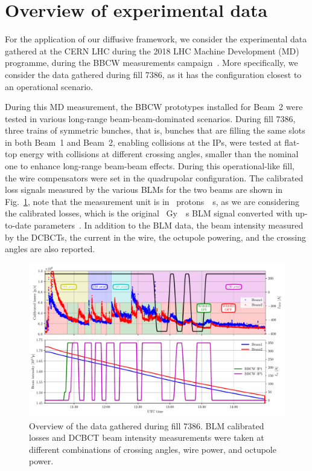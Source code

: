 \section{Overview of experimental data}\label{sec:5:wire-data}

For the application of our diffusive framework, we consider the experimental data gathered at the CERN LHC during the 2018 LHC Machine Development (MD) programme, during the BBCW measurements campaign~\cite{Poyet:2703503}. More specifically, we consider the data gathered during fill 7386, as it has the configuration closest to an operational scenario.

During this MD measurement, the BBCW prototypes installed for Beam~2 were tested in various long-range beam-beam-dominated scenarios. During fill 7386, three trains of symmetric bunches, that is, bunches that are filling the same slots in both Beam~1 and Beam~2, enabling collisions at the IPs, were tested at flat-top energy with collisions at different crossing angles, smaller than the nominal one to enhance long-range beam-beam effects. During this operational-like fill, the wire compensators were set in the quadrupolar configuration. The calibrated loss signals measured by the various BLMs for the two beams are shown in Fig.~\ref{fig:wire-data}, note that the measurement unit is in \SI{}{protons \per s}, as we are considering the calibrated losses, which is the original \SI{}{Gy \per s} BLM signal converted with up-to-date parameters~\cite{4439981}. In addition to the BLM data, the beam intensity measured by the DCBCTs, the current in the wire, the octupole powering, and the crossing angles are also reported. 

\begin{figure}[hpt]
    \centering
    \includegraphics[width=1.0\textwidth]{5_wire_compensators_LHC/figs/wire_summary.pdf}
    \caption{Overview of the data gathered during fill 7386. BLM calibrated losses and DCBCT beam intensity measurements were taken at different combinations of crossing angles, wire power, and octupole power.}
    \label{fig:wire-data}
\end{figure}

